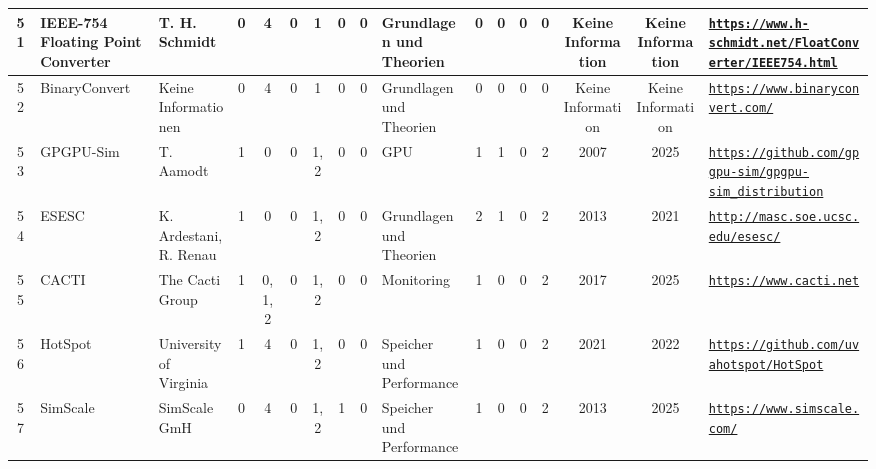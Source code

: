 \begin{landscape}
\begin{longtable}{|c|p{1cm}|p{1.3cm}|c|c|c|c|c|c|p{1.3cm}|c|c|c|c|c|c|p{2cm}|}
    51 & IEEE-754 Floating Point Converter & T. H. Schmidt & 0 & 4 & 0 & 1 & 0 & 0 & Grundlagen und Theorien & 0 & 0 & 0 & 0 & Keine Information & Keine Information & \href{https://www.h-schmidt.net/FloatConverter/IEEE754.html}{\nolinkurl{https://www.h-schmidt.net/FloatConverter/IEEE754.html}} \\ \hline
    52 & BinaryConvert & Keine Informationen & 0 & 4 & 0 & 1 & 0 & 0 & Grundlagen und Theorien & 0 & 0 & 0 & 0 & Keine Information & Keine Information & \href{https://www.binaryconvert.com/}{\nolinkurl{https://www.binaryconvert.com/}} \\ \hline
    53 & GPGPU-Sim & T. Aamodt & 1 & 0 & 0 & 1,2 & 0 & 0 & GPU & 1 & 1 & 0 & 2 & 2007 & 2025 & \href{https://github.com/gpgpu-sim/gpgpu-sim\_distribution}{\nolinkurl{https://github.com/gpgpu-sim/gpgpu-sim\_distribution}} \\ \hline
    54 & ESESC & K. Ardestani, R. Renau & 1 & 0 & 0 & 1,2 & 0 & 0 & Grundlagen und Theorien & 2 & 1 & 0 & 2 & 2013 & 2021 & \href{http://masc.soe.ucsc.edu/esesc/}{\nolinkurl{http://masc.soe.ucsc.edu/esesc/}} \\ \hline
    55 & CACTI & The Cacti Group & 1 & 0,1,2 & 0 & 1,2 & 0 & 0 & Monitoring & 1 & 0 & 0 & 2 & 2017 & 2025 & \href{https://www.cacti.net}{\nolinkurl{https://www.cacti.net}} \\ \hline
    56 & HotSpot & University of Virginia & 1 & 4 & 0 & 1,2 & 0 & 0 & Speicher und Performance & 1 & 0 & 0 & 2 & 2021 & 2022 & \href{https://github.com/uvahotspot/HotSpot}{\nolinkurl{https://github.com/uvahotspot/HotSpot}} \\ \hline
    57 & SimScale & SimScale GmH & 0 & 4 & 0 & 1,2 & 1 & 0 & Speicher und Performance & 1 & 0 & 0 & 2 & 2013 & 2025 & \href{https://www.simscale.com/}{\nolinkurl{https://www.simscale.com/}} \\ \hline     
\end{longtable}
\end{landscape}